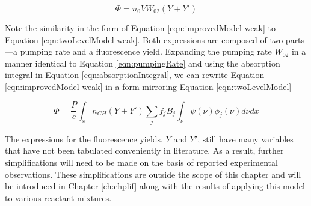 \begin{equation}
  \Phi = n_0VW_{02}(Y + Y')
  \label{eqn:improvedModel-weak}
\end{equation}

Note the similarity in the form of Equation \ref{eqn:improvedModel-weak} to Equation \ref{eqn:twoLevelModel-weak}.
Both expressions are composed of two parts---a pumping rate and a fluorescence yield.
Expanding the pumping rate \(W_{02}\) in a manner identical to Equation \ref{eqn:pumpingRate} and using the absorption integral in Equation \ref{eqn:absorptionIntegral}, we can rewrite Equation \ref{eqn:improvedModel-weak} in a form mirroring Equation \ref{eqn:twoLevelModel}

\begin{equation}
  \Phi = \frac{P}{c} \int_x n_{CH} (Y + Y') \sum_j f_j B_j \int_\nu \psi(\nu) \phi_j(\nu) d\nu dx
  \label{eqn:improvedModel}
\end{equation}

The expressions for the fluorescence yields, \(Y\) and \(Y'\), still have many variables that have not been tabulated conveniently in literature.
As a result, further simplifications will need to be made on the basis of reported experimental observations.
These simplifications are outside the scope of this chapter and will be introduced in Chapter \ref{ch:chplif} along with the results of applying this model to various reactant mixtures.

